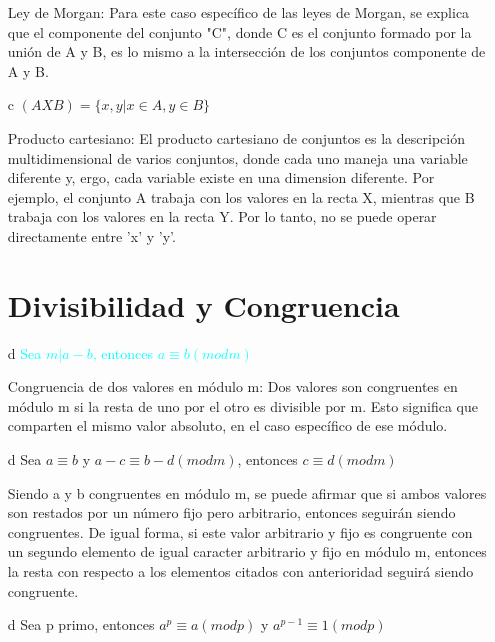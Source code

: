 \documentclass[letterpaper, 12pt]{article}
\begin{document}
\begin{itemize}
    Ley de Morgan: Para este caso espec\'ifico de las leyes de Morgan, se explica que el componente del conjunto "C", donde C es el conjunto formado por la uni\'on de A y B, es lo mismo a la intersecci\'on de los conjuntos componente de A y B. \newline
    
    \item[c] $(A X B) = \{x, y | x \in A, y \in B\}$\newline

    Producto cartesiano: El producto cartesiano de conjuntos es la descripci\'on multidimensional de varios conjuntos, donde cada uno maneja una variable diferente y, ergo, cada variable existe en una dimension diferente. Por ejemplo, el conjunto A trabaja con los valores en la recta X, mientras que B trabaja con los valores en la recta Y. Por lo tanto, no se puede operar directamente entre 'x' y 'y'. \newpage
    
\section{Divisibilidad y Congruencia}
    \item[d] \textcolor{cyan}{Sea $m|a-b$, entonces $a\equiv b (mod m)$} \newline

    Congruencia de dos valores en m\'odulo m: Dos valores son congruentes en m\'odulo m si la resta de uno por el otro es divisible por m. Esto significa que comparten el mismo valor absoluto, en el caso espec\'ifico de ese m\'odulo. \newline
    
    \item[d] Sea $a \equiv b $ y $ a-c \equiv b-d (mod m)$, entonces $ c\equiv d (mod m)$ \newline

    Siendo a y b congruentes en m\'odulo m, se puede afirmar que si ambos valores son restados por un n\'umero fijo pero arbitrario, entonces seguir\'an siendo congruentes. De igual forma, si este valor arbitrario y fijo es congruente con un segundo elemento de igual caracter arbitrario y fijo en m\'odulo m, entonces la resta con respecto a los elementos citados con anterioridad seguir\'a siendo congruente. \newline
    
    \item[d] Sea p primo, entonces $a^p \equiv a (mod p)$ y $a^{p-1}\equiv 1 (mod p)$ \newline


\end{itemize}
\end{document}
